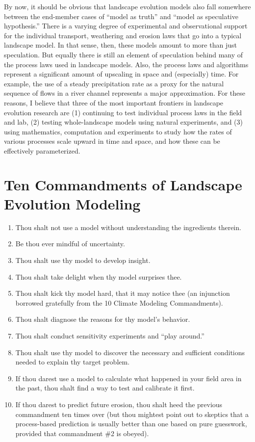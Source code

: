 \documentclass[12pt]{amsart}
\begin{document}
By now, it should be obvious that landscape evolution models also fall somewhere between the end-member cases of ``model as truth'' and ``model as speculative hypothesis.'' There is a varying degree of experimental and observational support for the individual transport, weathering and erosion laws that go into a typical landscape model. In that sense, then, these models amount to more than just speculation. But equally there is still an element of speculation behind many of the process laws used in landscape models. Also, the process laws and algorithms represent a significant amount of upscaling in space and (especially) time. For example, the use of a steady precipitation rate as a proxy for the natural sequence of flows in a river channel represents a major approximation. For these reasons, I believe that three of the most important frontiers in landscape evolution research are (1) continuing to test individual process laws in the field and lab, (2) testing whole-landscape models using natural experiments, and (3) using mathematics, computation and experiments to study how the rates of various processes scale upward in time and space, and how these can be effectively parameterized.

\section{Ten Commandments of Landscape Evolution Modeling}

\begin{enumerate}
\item Thou shalt not use a model without understanding the ingredients therein.
\item Be thou ever mindful of uncertainty.
\item Thou shalt use thy model to develop insight.
\item Thou shalt take delight when thy model surprises thee.
\item Thou shalt kick thy model hard, that it may notice thee (an injunction borrowed gratefully from the 10 Climate Modeling Commandments).
\item Thou shalt diagnose the reasons for thy model's behavior.
\item Thou shalt conduct sensitivity experiments and ``play around.''
\item Thou shalt use thy model to discover the necessary and sufficient conditions needed to explain thy target problem.
\item If thou darest use a model to calculate what happened in your field area in the past, thou shalt find a way to test and calibrate it first.
\item If thou darest to predict future erosion, thou shalt heed the previous commandment ten times over (but thou mightest point out to skeptics that a process-based prediction is usually better than one based on pure guesswork, provided that commandment \#2 is obeyed).
\end{enumerate}



\end{document}
